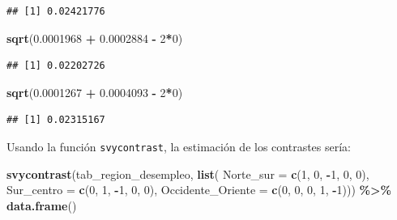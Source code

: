 \documentclass[
  spanish,
  12pt,
]{book}
\newenvironment{Shaded}{\begin{snugshade}}{\end{snugshade}}
\newcommand{\AttributeTok}[1]{\textcolor[rgb]{0.13,0.29,0.53}{#1}}
\newcommand{\DecValTok}[1]{\textcolor[rgb]{0.00,0.00,0.81}{#1}}
\newcommand{\FloatTok}[1]{\textcolor[rgb]{0.00,0.00,0.81}{#1}}
\newcommand{\FunctionTok}[1]{\textcolor[rgb]{0.13,0.29,0.53}{\textbf{#1}}}
\newcommand{\NormalTok}[1]{#1}
\newcommand{\SpecialCharTok}[1]{\textcolor[rgb]{0.81,0.36,0.00}{\textbf{#1}}}
\begin{document}
\begin{verbatim}
## [1] 0.02421776
\end{verbatim}

\begin{Shaded}
\begin{Highlighting}[]
\FunctionTok{sqrt}\NormalTok{(}\FloatTok{0.0001968} \SpecialCharTok{+} \FloatTok{0.0002884} \SpecialCharTok{{-}} \DecValTok{2}\SpecialCharTok{*}\DecValTok{0}\NormalTok{)}
\end{Highlighting}
\end{Shaded}

\begin{verbatim}
## [1] 0.02202726
\end{verbatim}

\begin{Shaded}
\begin{Highlighting}[]
\FunctionTok{sqrt}\NormalTok{(}\FloatTok{0.0001267} \SpecialCharTok{+} \FloatTok{0.0004093} \SpecialCharTok{{-}} \DecValTok{2}\SpecialCharTok{*}\DecValTok{0}\NormalTok{)}
\end{Highlighting}
\end{Shaded}

\begin{verbatim}
## [1] 0.02315167
\end{verbatim}

Usando la función \texttt{svycontrast}, la estimación de los contrastes sería:

\begin{Shaded}
\begin{Highlighting}[]
\FunctionTok{svycontrast}\NormalTok{(tab\_region\_desempleo, }\FunctionTok{list}\NormalTok{(}
                             \AttributeTok{Norte\_sur =} \FunctionTok{c}\NormalTok{(}\DecValTok{1}\NormalTok{, }\DecValTok{0}\NormalTok{, }\SpecialCharTok{{-}}\DecValTok{1}\NormalTok{, }\DecValTok{0}\NormalTok{, }\DecValTok{0}\NormalTok{),}
                             \AttributeTok{Sur\_centro =} \FunctionTok{c}\NormalTok{(}\DecValTok{0}\NormalTok{, }\DecValTok{1}\NormalTok{, }\SpecialCharTok{{-}}\DecValTok{1}\NormalTok{, }\DecValTok{0}\NormalTok{, }\DecValTok{0}\NormalTok{),}
                             \AttributeTok{Occidente\_Oriente =} \FunctionTok{c}\NormalTok{(}\DecValTok{0}\NormalTok{, }\DecValTok{0}\NormalTok{, }\DecValTok{0}\NormalTok{, }\DecValTok{1}\NormalTok{, }\SpecialCharTok{{-}}\DecValTok{1}\NormalTok{))) }\SpecialCharTok{\%\textgreater{}\%} \FunctionTok{data.frame}\NormalTok{()}
\end{Highlighting}
\end{Shaded}
\end{document}
